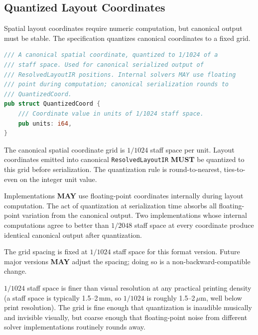 \documentclass[11pt,letterpaper]{report}
\newcounter{requirement}[chapter]
\newcommand{\MUST}{\textbf{MUST}}
\newcommand{\MAY}{\textbf{MAY}}
\begin{document}
\subsection{Quantized Layout Coordinates}

Spatial layout coordinates require numeric computation, but
canonical output must be stable. The specification quantizes
canonical coordinates to a fixed grid.

\begin{lstlisting}[language=Rust]
/// A canonical spatial coordinate, quantized to 1/1024 of a
/// staff space. Used for canonical serialized output of
/// ResolvedLayoutIR positions. Internal solvers MAY use floating
/// point during computation; canonical serialization rounds to
/// QuantizedCoord.
pub struct QuantizedCoord {
    /// Coordinate value in units of 1/1024 staff space.
    pub units: i64,
}
\end{lstlisting}

\begin{requirement}
  \label{req:determinism:layout-coordinate-quantization}
  The canonical spatial coordinate grid is $1/1024$ staff space
  per unit. Layout coordinates emitted into canonical
  \texttt{ResolvedLayoutIR} \MUST{} be quantized to this grid
  before serialization. The quantization rule is round-to-nearest,
  ties-to-even on the integer unit value.

  Implementations \MAY{} use floating-point coordinates internally
  during layout computation. The act of quantization at
  serialization time absorbs all floating-point variation from
  the canonical output. Two implementations whose internal
  computations agree to better than $1/2048$ staff space at
  every coordinate produce identical canonical output after
  quantization.

  The grid spacing is fixed at $1/1024$ staff space for this
  format version. Future major versions \MAY{} adjust the
  spacing; doing so is a non-backward-compatible change.
\end{requirement}

\begin{rationale}
  $1/1024$ staff space is finer than visual resolution at any
  practical printing density (a staff space is typically 1.5--2\,mm,
  so $1/1024$ is roughly 1.5--2\,$\mu$m, well below print
  resolution). The grid is fine enough that quantization is
  inaudible musically and invisible visually, but coarse enough
  that floating-point noise from different solver implementations
  routinely rounds away.
\end{rationale}
\end{document}
